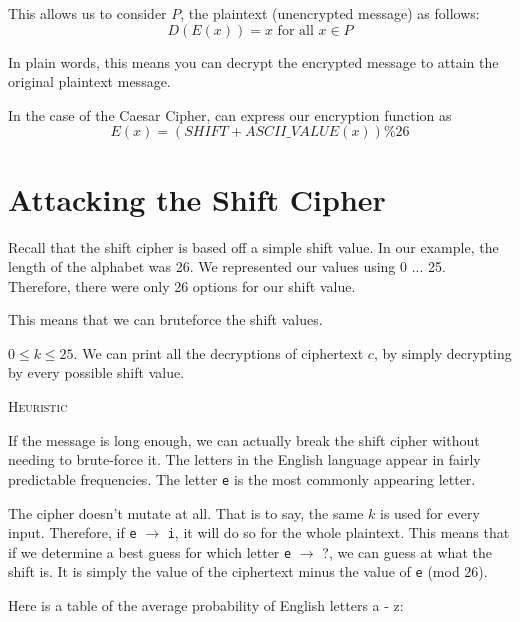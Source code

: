 This allows us to consider $P$, the plaintext (unencrypted message) as follows:
\[
D(E(x)) = x \text{ for all } x \in P
\]

In plain words, this means you can decrypt the encrypted message to attain the original plaintext message. 

In the case of the Caesar Cipher, can express our encryption function as
\[
E(x) = (SHIFT + ASCII\_VALUE(x)) \% 26
\]

\section{Attacking the Shift Cipher}

Recall that the shift cipher is based off a simple shift value. In our
example, the length of the alphabet was 26. We represented our values
using 0 ... 25. Therefore, there were only 26 options for our shift value.

This means that we can bruteforce the shift values.

$0 \leq k \leq 25$. We can print all the decryptions of ciphertext $c$, by
simply decrypting by every possible shift value.

\textsc{Heuristic}

If the message is long enough, we can actually break the shift cipher
without needing to brute-force it. The letters in the English language
appear in fairly predictable frequencies. The letter \texttt{e} is
the most commonly appearing letter.

The cipher doesn't mutate at all. That is to say, the same $k$ is used
for every input. Therefore, if \texttt{e} $\to$ \texttt{i}, it will do so
for the whole plaintext. This means that if we determine a best guess for
which letter \texttt{e} $\to$ ?, we can guess at what the shift is. It is
simply the value of the ciphertext minus the value of \texttt{e} (mod 26).

Here is a table of the average probability of English letters a - z:


